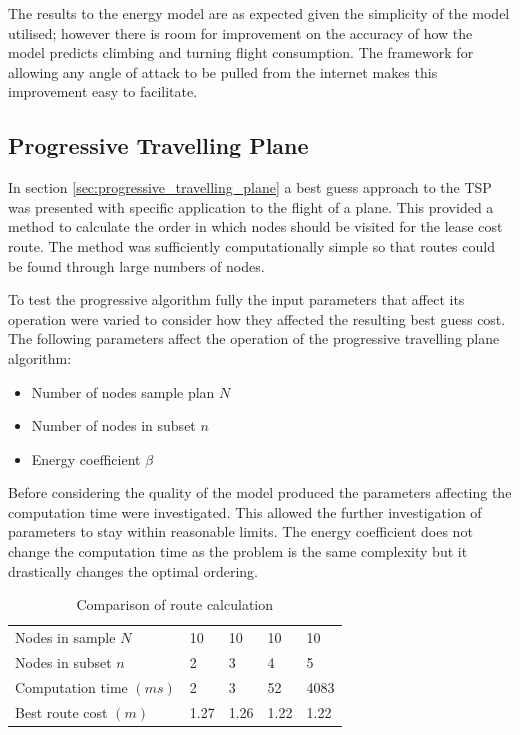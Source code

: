 \documentclass[a4paper,12pt,twoside]{article}
\begin{document}
The results to the energy model are as expected given the simplicity of the model utilised; however there is room for improvement on the accuracy of how the model predicts climbing and turning flight consumption. The framework for allowing any angle of attack to be pulled from the internet makes this improvement easy to facilitate.

\subsection{Progressive Travelling Plane}
\label{sec:progressive_travelling_plane_0}

In section \ref{sec:progressive_travelling_plane} a best guess approach to the TSP was presented with specific application to the flight of a plane. This provided a method to calculate the order in which nodes should be visited for the lease cost route. The method was sufficiently computationally simple so that routes could be found through large numbers of nodes.

To test the progressive algorithm fully the input parameters that affect its operation were varied to consider how they affected the resulting best guess cost. The following parameters affect the operation of the progressive travelling plane algorithm:

\begin{itemize}
\setlength{\itemsep}{-12pt}
\item Number of nodes sample plan $N$
\item Number of nodes in subset $n$
\item Energy coefficient $\beta$

\end{itemize}

Before considering the quality of the model produced the parameters affecting the computation time were investigated. This allowed the further investigation of parameters to stay within reasonable limits. The energy coefficient does not change the computation time as the problem is the same complexity but it drastically changes the optimal ordering.

\begin{table}[width=\textwidth]
\centering

    \begin{tabular}{lllll}
    Nodes in sample $N$	& 10	& 10	& 10	& 10	\\
Nodes in subset $n$	& 2	& 3	& 4	& 5	\\
Computation time $(ms)$	& 2	& 3	& 52	& 4083	\\
Best route cost $(m)$	& 1.27	& 1.26	& 1.22	& 1.22	\\

    \end{tabular}
\caption{Comparison of route calculation}
\label{tbl:comparison_of_route_calculation_0}
\end{table}
\end{document}

